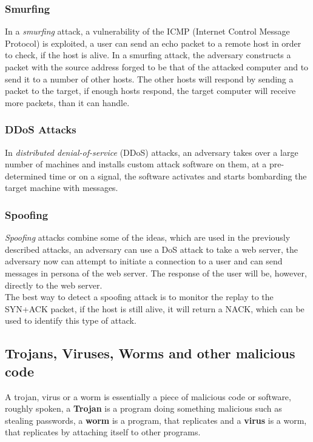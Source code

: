 \documentclass[a4paper, 10 pt, conference]{ieeeconf}
\begin{document}
\subsubsection{\textbf{Smurfing}}
\label{smurf}
In a \emph{smurfing} attack, a vulnerability of the ICMP (Internet Control Message Protocol) is exploited, a user can send an echo packet to a remote host in order to check, if the host is alive. In a smurfing attack, the adversary constructs a packet with the source address forged to be that of the attacked computer and to send it to a number of other hosts.
The other hosts will respond by sending a packet to the target, if enough hosts respond, the target computer will receive more packets, than it can handle. 
\vspace{0.5cm}
\subsubsection{\textbf{DDoS Attacks}}
In \emph{distributed denial-of-service} (DDoS) attacks, an adversary takes over a large number of machines and installs custom attack software on them, at a pre-determined time or on a signal, the software activates and starts bombarding the target machine with messages. 
\vspace{0.5cm}
\subsubsection{\textbf{Spoofing}}
\emph{Spoofing} attacks combine some of the ideas, which are used in the previously described attacks, an adversary can use a DoS attack to take a web server, the adversary now can attempt to initiate a connection to a user and can send messages in persona of the web server. The response of the user will be, however, directly to the web server. \\
The best way to detect a spoofing attack is to monitor the replay to the SYN+ACK packet, if the host is still alive, it will return a NACK, which can be used to identify this type of attack. 

\subsection{\textbf{Trojans, Viruses, Worms and other malicious code}}
A trojan, virus or a worm is essentially a piece of malicious code or software, roughly spoken, a \textbf{Trojan} is a program doing something malicious such as stealing passwords, a \textbf{worm} is a program, that replicates and a \textbf{virus} is a worm, that replicates by attaching itself to other programs. 
\end{document}
